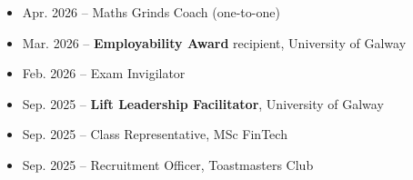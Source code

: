 \documentclass[letterpaper,11pt]{article}
\begin{document}
\begin{itemize}[itemsep=1pt, parsep=1pt, before=\vspace{1pt}]
    \item Apr. 2026 -- Maths Grinds Coach (one-to-one)
    \item Mar. 2026 -- \textbf{Employability Award} recipient, University of Galway 
    \item Feb. 2026 -- Exam Invigilator
    \item Sep. 2025 -- \textbf{Lift Leadership Facilitator}, University of Galway
    \item Sep. 2025 -- Class Representative, MSc FinTech
    \item Sep. 2025 -- Recruitment Officer, Toastmasters Club
    
\end{itemize}


\end{document}
